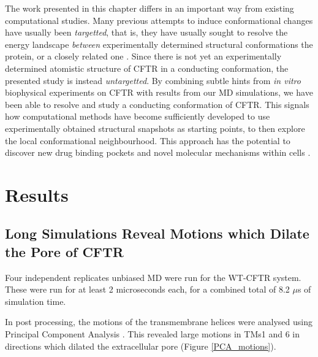 The work presented in this chapter differs in an important way from existing computational studies. Many previous attempts to induce conformational changes have usually been \textit{targetted}, that is, they have usually sought to resolve the energy landscape \textit{between} experimentally determined structural conformations the protein, or a closely related one \cite{hoffman2018, lev2020, bergh2021, mccomas2022}. Since there is not yet an experimentally determined atomistic structure of CFTR in a conducting conformation, the presented study is instead \textit{untargetted}. By combining subtle hints from \textit{in vitro} biophysical experiments on CFTR with results from our MD simulations, we have been able to resolve and study a conducting conformation of CFTR. This signals how computational methods have become sufficiently developed to use experimentally obtained structural snapshots as starting points, to then explore the local conformational neighbourhood. This approach has the potential to discover new drug binding pockets and novel molecular mechanisms within cells \cite{}.

\section{Results}

\subsection{Long Simulations Reveal Motions which Dilate the Pore of CFTR}
Four independent replicates unbiased MD were run for the WT-CFTR system. These were run for at least 2 microseconds each, for a combined total of 8.2 $\mu$s of simulation time. 

In post processing, the motions of the transmembrane helices were analysed using Principal Component Analysis \cite{pearson1901, hotelling1936}. This revealed large motions in TMs1 and 6 in directions which dilated the extracellular pore (Figure \ref{PCA_motions}).  

